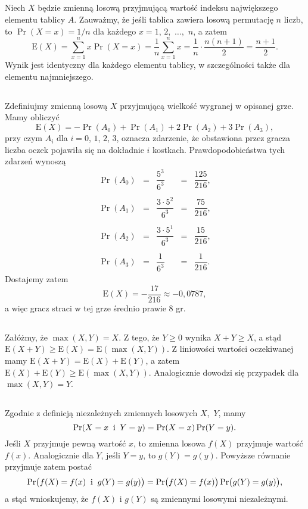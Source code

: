 \subsection{} %
Niech $X$ będzie zmienną losową przyjmującą wartość indeksu największego elementu tablicy $A$. Zauważmy, że jeśli tablica zawiera losową permutację $n$ liczb, to $\Pr(X=x)=1/n$ dla każdego $x=1$, $2$,~$\dots$,~$n$, a zatem
\[
	\mathrm{E}(X) = \sum_{x=1}^nx\Pr(X=x) = \frac{1}{n}\sum_{x=1}^nx = \frac{1}{n}\cdot\frac{n(n+1)}{2} = \frac{n+1}{2}.
\]
Wynik jest identyczny dla każdego elementu tablicy, w szczególności także dla elementu najmniejszego.

\subsection{} %
Zdefiniujmy zmienną losową $X$ przyjmującą wielkość wygranej w opisanej grze. Mamy obliczyć
\[
	\mathrm{E}(X) = -\Pr(A_0)+\Pr(A_1)+2\Pr(A_2)+3\Pr(A_3),
\]
przy czym $A_i$ dla $i=0$, $1$, $2$, $3$, oznacza zdarzenie, że obstawiona przez gracza liczba oczek pojawiła się na dokładnie $i$ kostkach. Prawdopodobieństwa tych zdarzeń wynoszą
\[
\begin{array}{rcccr}
	\Pr(A_0) &=& \dfrac{5^3}{6^3} &=& \dfrac{125}{216}, \\\\
	\Pr(A_1) &=& \dfrac{3\cdot 5^2}{6^3} &=& \dfrac{75}{216}, \\\\
	\Pr(A_2) &=& \dfrac{3\cdot 5^1}{6^3} &=& \dfrac{15}{216}, \\\\
	\Pr(A_3) &=& \dfrac{1}{6^3} &=& \dfrac{1}{216}.
\end{array}
\]
Dostajemy zatem
\[
	\mathrm{E}(X) = -\dfrac{17}{216} \approx -0{,}0787,
\]
a więc gracz straci w tej grze średnio prawie 8 gr.

\subsection{} %
Załóżmy, że $\max(X,Y)=X$. Z tego, że $Y\ge0$ wynika $X+Y\ge X$, a stąd $\mathrm{E}(X+Y)\ge\mathrm{E}(X)=\mathrm{E}(\max(X,Y))$. Z liniowości wartości oczekiwanej mamy $\mathrm{E}(X+Y)=\mathrm{E}(X)+\mathrm{E}(Y)$, a zatem $\mathrm{E}(X)+\mathrm{E}(Y)\ge\mathrm{E}(\max(X,Y))$. Analogicznie dowodzi się przypadek dla $\max(X,Y)=Y$.

\subsection{} %
Zgodnie z definicją niezależnych zmiennych losowych $X$,~$Y$, mamy
\[
	\Pr(X=x\;\;\hbox{i}\;\;Y=y) = \Pr(X=x)\Pr(Y=y).
\]
Jeśli $X$ przyjmuje pewną wartość $x$, to zmienna losowa $f(X)$ przyjmuje wartość $f(x)$. Analogicznie dla $Y$, jeśli $Y=y$, to $g(Y)=g(y)$. Powyższe równanie przyjmuje zatem postać
\[
	\Pr\bigl(f(X)=f(x)\;\;\hbox{i}\;\;g(Y)=g(y)\bigr) = \Pr\bigl(f(X)=f(x)\bigr)\Pr\bigl(g(Y)=g(y)\bigr),
\]
a stąd wnioskujemy, że $f(X)$ i $g(Y)$ są zmiennymi losowymi niezależnymi.

